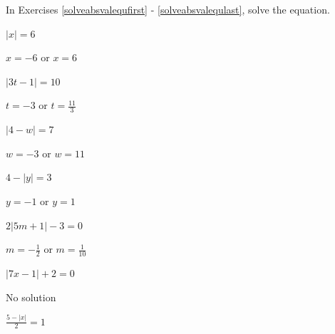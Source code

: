 \documentclass{ximera}
\begin{document}
	\author{Stitz-Zeager}



\label{ExercisesforAppAbsValEqIneq}

\begin{question}
In Exercises \ref{solveabsvalequfirst} - \ref{solveabsvalequlast}, solve the equation.


\begin{problem}\label{solveabsvalequfirst} 
$|x| = 6$ 

\begin{solution}
    $x = -6$ or $x=6$ 
\end{solution}
\end{problem}

\begin{problem}
$|3t-1| = 10$

\begin{solution}
    $t = -3$ or $t= \frac{11}{3}$
\end{solution}
\end{problem}

\begin{problem}
$|4-w| = 7$

\begin{solution}
     $w = -3$ or $w= 11$
\end{solution}
\end{problem}

\begin{problem}
$4 - |y| = 3$

\begin{solution}
    $y = -1$ or $y= 1$
\end{solution}
\end{problem}

\begin{problem}
$2|5m+1| - 3 = 0$

\begin{solution}
    $m=-\frac{1}{2}$ or $m= \frac{1}{10}$
\end{solution}
\end{problem}

\begin{problem}
$|7x-1| + 2 = 0$

\begin{solution}
    No solution
\end{solution}
\end{problem}

\begin{problem}
$\frac{5 - |x|}{2} = 1$


\end{problem}
\end{question}
\end{document}
